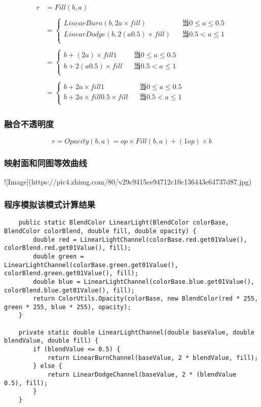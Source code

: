 $$\begin{aligned}r&= Fill(b,a)\\\\&=\left\{\begin{aligned}LinearBurn(b,2a\times fill)&&当 0\leq a \leq 0.5\\LinearDodge(b,2(a0.5)\times fill)&&当 0.5< a \leq 1\\\end{aligned}\right.\\\\&=\left\{\begin{aligned}b+(2a)\times fill1&&当 0\leq a \leq 0.5\\b+2(a0.5)\times fill&&当 0.5< a \leq 1\\\end{aligned}\right.\\\\&=\left\{\begin{aligned}b+2a\times fill1&&当 0\leq a \leq 0.5\\b+2a\times fill0.5\times fill&&当 0.5< a \leq 1\\\end{aligned}\right.\end{aligned}$$

\subsubsection{ 融合不透明度}

$$r=Opacity(b,a)=op\times Fill(b,a)+(1op)\times b$$

\subsubsection{ 映射面和同图等效曲线}

![Image](https://pic4.zhimg.com/80/v29c9415ce94712c10c136443e64737d87.jpg)

\subsubsection{ 程序模拟该模式计算结果}

\begin{lstlisting}
	public static BlendColor LinearLight(BlendColor colorBase, BlendColor colorBlend, double fill, double opacity) {
		double red = LinearLightChannel(colorBase.red.get01Value(), colorBlend.red.get01Value(), fill);
		double green = LinearLightChannel(colorBase.green.get01Value(), colorBlend.green.get01Value(), fill);
		double blue = LinearLightChannel(colorBase.blue.get01Value(), colorBlend.blue.get01Value(), fill);
		return ColorUtils.Opacity(colorBase, new BlendColor(red * 255, green * 255, blue * 255), opacity);
	}
	
	private static double LinearLightChannel(double baseValue, double blendValue, double fill) {
		if (blendValue <= 0.5) {
			return LinearBurnChannel(baseValue, 2 * blendValue, fill);
		} else {
			return LinearDodgeChannel(baseValue, 2 * (blendValue  0.5), fill);
		}
	}
\end{lstlisting}


